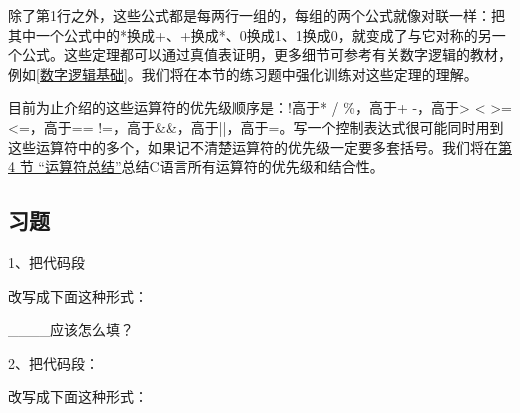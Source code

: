 \smallskip
{}
\smallskip
{}
\smallskip
{}
\smallskip
{}
\smallskip
{}
\smallskip
{}
\smallskip
{}
\smallskip
{}
\smallskip
{}
\smallskip
{}
\smallskip
{}
\smallskip
{}


除了第1行之外，这些公式都是每两行一组的，每组的两个公式就像对联一样：把其中一个公式中的*换成+、+换成*、0换成1、1换成0，就变成了与它对称的另一个公式。这些定理都可以通过真值表证明，更多细节可参考有关数字逻辑的教材，例如\hyperlink{db.bi01.bibli.vhdl}{[数字逻辑基础]}。我们将在本节的练习题中强化训练对这些定理的理解。



目前为止介绍的这些运算符的优先级顺序是：!高于* / \%，高于+ -，高于\textgreater{} \textless{} \textgreater{}= \textless{}=，高于== !=，高于\&\&，高于||，高于=。写一个控制表达式很可能同时用到这些运算符中的多个，如果记不清楚运算符的优先级一定要多套括号。我们将在\hyperlink{db.ch16s04.id2763540}{第 4 节 “运算符总结”}总结C语言所有运算符的优先级和结合性。


\subsection*{习题}
%


1、把代码段




改写成下面这种形式：




\_\_\_\_应该怎么填？



2、把代码段：




改写成下面这种形式：




